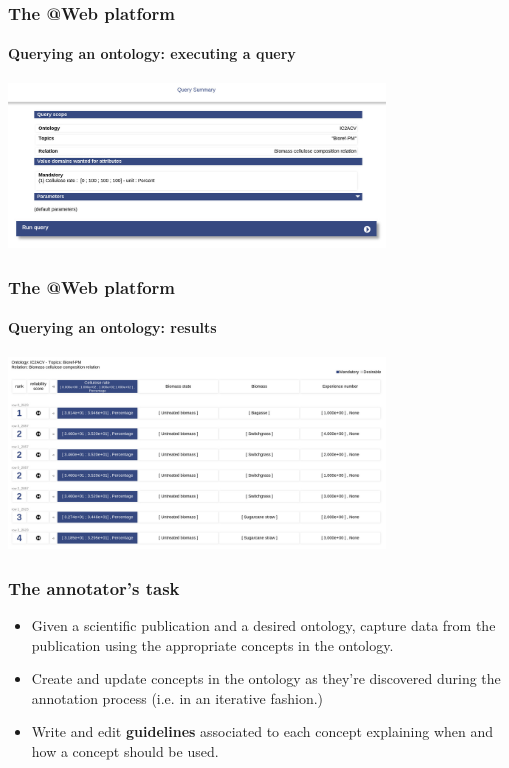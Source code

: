\documentclass{beamer}
\begin{document}
\begin{frame}
  \frametitle{The \textbf{@Web} platform}
  \framesubtitle{Querying an ontology: executing a query}

  \begin{center}
    \includegraphics[width=10cm]{atweb-query-3.jpg}
  \end{center}
\end{frame}

\begin{frame}
  \frametitle{The \textbf{@Web} platform}
  \framesubtitle{Querying an ontology: results}

  \begin{center}
    \includegraphics[width=10cm]{atweb-query-4.jpg}
  \end{center}
\end{frame}

\begin{frame}
  \frametitle{The annotator's task}

  \begin{itemize}
    \item Given a scientific publication and a desired ontology, capture data from the publication using the appropriate concepts in the ontology.

    \pause

    \item Create and update concepts in the ontology as they're discovered during the annotation process (i.e. in an iterative fashion.)

    \pause

    \item Write and edit \textbf{guidelines} associated to each concept explaining when and how a concept should be used.
  \end{itemize}
\end{frame}
\end{document}
